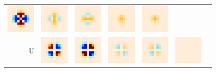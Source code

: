 \documentclass{article}
\begin{document}
\begin{figure}
\begin{tabular}{rm{11mm}m{11mm}m{11mm}m{11mm}m{11mm}m{11mm}}
		\includegraphics[height=14mm]{plots/ellip_mismatch_srcs_sb_det1_crop_1.png} &
		\includegraphics[height=14mm]{plots/ellip_mismatch_srcs_sb_det01_crop_1.png} &
		\includegraphics[height=14mm]{plots/ellip_mismatch_srcs_sb_det23_crop_1.png} &
		\includegraphics[height=14mm]{plots/ellip_mismatch_srcs_sb_tot_crop_1.png} &
		\includegraphics[height=14mm]{plots/circular_srcs_sb_tot_crop_1.png} \\
		U &
		\includegraphics[height=14mm]{plots/ellip_mismatch_srcs_sb_det0_crop_2.png} &
		\includegraphics[height=14mm]{plots/ellip_mismatch_srcs_sb_det1_crop_2.png} &
		\includegraphics[height=14mm]{plots/ellip_mismatch_srcs_sb_det01_crop_2.png} &
		\includegraphics[height=14mm]{plots/ellip_mismatch_srcs_sb_det23_crop_2.png} &
		\includegraphics[height=14mm]{plots/ellip_mismatch_srcs_sb_tot_crop_2.png} &

\end{tabular}
\end{figure}
\end{document}
